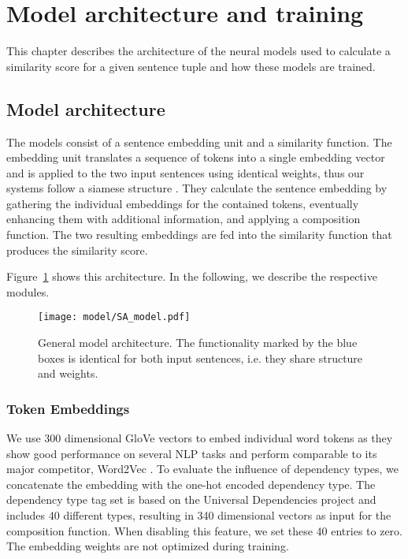\section{Model architecture and training}
This chapter describes the architecture of the neural models used to calculate a similarity score for a given sentence tuple and how these models are trained.

\subsection{Model architecture} \label{subsec:architecture}
The models consist of a sentence embedding unit and a similarity function. The embedding unit translates a sequence of tokens into a single embedding vector and is applied to the two input sentences using identical weights, thus our systems follow a siamese structure \autocite{bromley_signature_1994}. %
They calculate the sentence embedding by gathering the individual embeddings for the contained tokens, eventually enhancing them with additional information, and applying a composition function. The two resulting embeddings are fed into the similarity function that produces the similarity score. 

Figure~\ref{fig:model_architecture} shows this architecture. In the following, we describe the respective modules. 

\begin{figure}[htb!]
	\centering
	\texttt{[image: model/SA\_model.pdf]}
	\caption{General model architecture. The functionality marked by the blue boxes is identical for both input sentences, i.e. they share structure and weights.}
	\label{fig:model_architecture}
\end{figure}

\subsubsection{Token Embeddings}
We use 300 dimensional GloVe vectors \autocite{pennington_glove_2014} to embed individual word tokens as they show good performance on several \ac{NLP} tasks and perform comparable to its major competitor, Word2Vec \autocite{levy_improving_2015,naili_comparative_2017}. To evaluate the influence of dependency types, we concatenate the embedding with the one-hot encoded dependency type. The dependency type tag set is based on the Universal Dependencies project \autocite{nivre_universal_2016} and includes 40 different types, resulting in 340 dimensional vectors as input for the composition function. When disabling this feature, we set these 40 entries to zero. The embedding weights are not optimized during training.   

